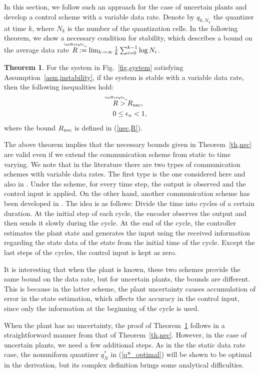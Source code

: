 \documentclass[a4paper, 11pt]{article}
\makeatletter
\def\widebar{\accentset{{\cc@style\underline{\mskip10mu}}}}
\newcommand{\Rnec}{R_{\textnormal{nec}}}
\theoremstyle{definition}
\newtheorem{thm}{Theorem}
\newcommand{\fref}[1]{Fig.~\ref{#1}}
\makeatother
\begin{document}
In this section, we follow such an approach for the case of uncertain plants
and develop a control scheme with a variable data rate.
Denote by $q_{k,N_k}$ the quantizer at time $k$, where $N_k$ is the number
of the quantization cells.
In the following theorem, we show a necessary condition for stability,
which describes a bound on the average data rate
$\widebar R:=\lim_{k\to\infty}\frac{1}{k}\sum^{k-1}_{i=0}\log N_i$.

\begin{thm}\label{th,necm}
 For the system in \fref{fig,system} satisfying Assumption~\ref{asm,instability},
if the system is stable with a variable data rate, then the following inequalities
hold:
\begin{align}
 &\widebar R >\Rnec,\label{necm,R}\\
 &0\leq\epsilon_n<1,\label{necm,e}
\end{align}
where the bound $\Rnec$ is defined in (\ref{nec,R}).
\end{thm}

The above theorem implies that the necessary bounds given in Theorem~\ref{th,nec}
are valid even if we extend the communication scheme from static to time varying.
We note that in the literature there are two types of communication schemes with
variable data rates.
The first type is the one considered here and also in \cite{Tatikonda2004}.
Under the scheme, for every time step, the output is observed and the
control input is applied.
On the other hand, another communication scheme has been developed in
\cite{Nair2004, You2010, Okano2012}.
The idea is as follows:
Divide the time into cycles of a certain duration.
At the initial step of each cycle, the encoder observes the output and
then sends it slowly during the cycle.
At the end of the cycle, the controller estimates the plant state
and generates the input using the received information regarding the state
data of the state from the initial time of the cycle.
Except the last steps of the cycles, the control input is kept as zero.

It is interesting that when the plant is known, these two schemes
provide the same bound on the data rate, but for uncertain plants, the bounds
are different.
This is because in the latter scheme, the plant uncertainty causes
accumulation of error in the state estimation, which affects the accuracy
in the control input, since only the information at the beginning of the
cycle is used.

When the plant has no uncertainty, the proof of Theorem~\ref{th,necm} follows
in a straightforward manner from that of Theorem~\ref{th,nec}.
However, in the case of uncertain plants, we need a few additional steps.
As in the the static data rate case, the nonuniform quantizer $q_N^*$ in
(\ref{q*_optimal}) will be shown to be optimal in the derivation, but its
complex definition brings some analytical difficulties.
\end{document}
